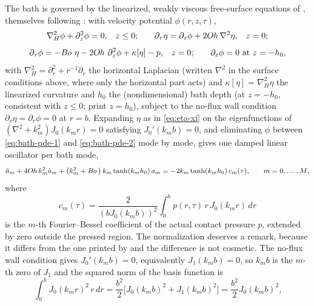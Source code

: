 The bath is governed by the linearized, weakly viscous free-surface equations of \cite{AlventosaEtAl2023}, themselves following \cite{DiasEtAl2008}: with velocity potential $\phi(r,z,\tau)$,
\begin{equation}
    \nabla_H^2\phi+\partial_z^2\phi=0\text{,}\quad z\le0\text{;}\qquad
    \partial_\tau\eta = \partial_z\phi+2O\kern-0.04em h\,\nabla^2\eta\text{,}\quad z=0\text{;}
    \label{eq:bath-pde-1}
\end{equation}
\begin{equation}
    \partial_\tau\phi = -B\kern-0.04em o\,\,\eta - 2O\kern-0.04em h\,\,\partial_z^2\phi + \kappa[\eta] - p\text{,}\quad z=0\text{;}\qquad
    \partial_z\phi=0\text{ at }z=-h_0\text{,}
    \label{eq:bath-pde-2}
\end{equation}
with $\nabla_H^2=\partial_r^2+r^{-1}\partial_r$ the horizontal Laplacian (written $\nabla^2$ in the surface conditions above, where only the horizontal part acts) and $\kappa[\eta]=\nabla_H^2\eta$ the linearized curvature and $h_0$ the (nondimensional) bath depth (at $z=-h_0$, consistent with $z\le0$; \citealt{AlventosaEtAl2023} print $z=h_0$), subject to the no-flux wall condition $\partial_r\eta=\partial_r\phi=0$ at $r=b$. Expanding $\eta$ as in \eqref{eq:eta-xi} on the eigenfunctions of $(\nabla^2+k_m^2)J_0(k_mr)=0$ satisfying $J_0'(k_mb)=0$, and eliminating $\phi$ between \eqref{eq:bath-pde-1} and \eqref{eq:bath-pde-2} mode by mode, gives one damped linear oscillator per bath mode,
\begin{equation}
    \ddot a_m + 4O\kern-0.04em h\, k_m^2 \dot a_m + \left(k_m^2+B\kern-0.04em o\,\right)k_m\tanh(k_m h_0)\, a_m = -2 k_m \tanh(k_m h_0)\, c_m(\tau)\text{,}\qquad m=0,\dots,M\text{,}
    \label{eq:bath-mode}
\end{equation}
where
\begin{equation}
    c_m(\tau) = \frac{2}{(bJ_0(k_mb))^2}\int_0^b p(r,\tau)\,r\,J_0(k_mr)\,dr
    \label{eq:c_m-def}
\end{equation}
is the $m$-th Fourier--Bessel coefficient of the actual contact pressure $p$, extended by zero outside the pressed region. The normalization deserves a remark, because it differs from the one printed by \cite{AlventosaEtAl2023} and the difference is not cosmetic. The no-flux wall condition gives $J_0'(k_mb)=0$, equivalently $J_1(k_mb)=0$, so $k_mb$ is the $m$-th zero of $J_1$ and the squared norm of the basis function is
\begin{equation}
    \int_0^bJ_0(k_mr)^2\,r\,dr = \frac{b^2}{2}\Big[J_0(k_mb)^2+J_1(k_mb)^2\Big] = \frac{b^2}{2}J_0(k_mb)^2\text{,}
    \label{eq:bessel-norm}
\end{equation}
